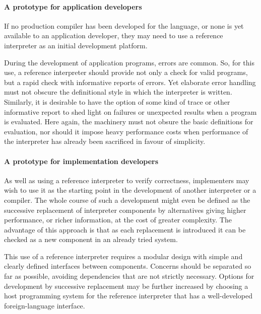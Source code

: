 \paragraph{A prototype for application developers}
If no production compiler has been developed for the language,
or none is yet available to an application developer,
they may need to use a reference interpreter as
an initial development platform.

During the development of application programs, errors
are common.
So, for this use, a reference interpreter should provide
not only a check for valid programs, but a rapid check
with informative reports of errors.
Yet elaborate error handling must not obscure the
definitional style in which the interpreter is written.
Similarly, it is desirable to have the option of some
kind of trace or other informative report to shed
light on failures or unexpected results when a program
is evaluated.
Here again, the machinery must not obsure the basic
definitions for evaluation, nor should it impose heavy
performance costs when performance of the interpreter
has already been sacrificed in favour of simplicity.

\paragraph{A prototype for implementation developers}
As well as using a reference interpreter to verify correctness,
implementers may wish to use it as the starting point in the
development of another interpreter or a compiler.
The whole course of such a development might even be defined as
the successive replacement of interpreter components by
alternatives giving higher performance, or richer information,
at the cost of greater complexity.
The advantage of this approach is that as each replacement
is introduced it can be checked as a new component in an already
tried system.

This use of a reference interpreter requires a
modular design with simple and clearly defined interfaces
between components.
Concerns should be separated so far as possible, avoiding
dependencies that are not strictly necessary.
Options for development by successive replacement may be further
increased by choosing a host programming system for the reference
interpreter that has a well-developed foreign-language interface. 

